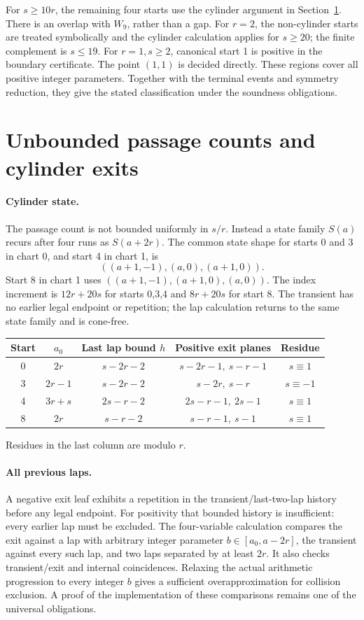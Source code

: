 \documentclass[11pt]{amsart}
\newcommand{\claimid}[1]{}
\theoremstyle{definition}\newtheorem{definition}[theorem]{Definition}
\begin{document}
For $s\ge10r$, the remaining four starts use the cylinder argument in
Section~\ref{sec:cylinders}. There is an overlap with $W_9$, rather than
a gap. For $r=2$, the non-cylinder starts are treated symbolically and
the cylinder calculation applies for $s\ge20$; the finite complement is
$s\le19$. For $r=1,s\ge2$, canonical start 1 is positive in the boundary
certificate. The point $(1,1)$ is decided directly. These regions cover
all positive integer parameters. Together with the terminal events and
symmetry reduction, they give the stated classification under the
soundness obligations.

\section{Unbounded passage counts and cylinder exits}\label{sec:cylinders}
\paragraph{Cylinder state.}\label{lem:cylinders}
The passage count is not bounded uniformly in $s/r$. Instead a state
family $S(a)$ recurs after four runs as $S(a+2r)$. The common state shape
for starts 0 and 3 in chart 0, and start 4 in chart 1, is
\[
 ((a+1,-1),(a,0),(a+1,0)).
\]
Start 8 in chart 1 uses $((a+1,-1),(a+1,0),(a,0))$.
The index increment is $12r+20s$ for starts 0,3,4 and $8r+20s$ for
start 8. The transient has no earlier legal endpoint or repetition;
the lap calculation returns to the same state family and is cone-free.
\claimid{lem:cylinders}

\begin{center}\small
\begin{tabular}{c c c c c}
\toprule
Start&$a_0$&Last lap bound $h$&Positive exit planes&Residue\\\midrule
0&$2r$&$s-2r-2$&$s-2r-1,\ s-r-1$&$s\equiv1$\\
3&$2r-1$&$s-2r-2$&$s-2r,\ s-r$&$s\equiv-1$\\
4&$3r+s$&$2s-r-2$&$2s-r-1,\ 2s-1$&$s\equiv1$\\
8&$2r$&$s-r-2$&$s-r-1,\ s-1$&$s\equiv1$\\\bottomrule
\end{tabular}
\end{center}
Residues in the last column are modulo $r$.

\paragraph{All previous laps.}\label{lem:history}
A negative exit leaf exhibits a repetition in the transient/last-two-lap
history before any legal endpoint. For positivity that bounded history
is insufficient: every earlier lap must be excluded. The four-variable
calculation compares the exit against a lap with arbitrary integer
parameter $b\in[a_0,a-2r]$, the transient against every such lap,
and two laps separated by at least $2r$. It also checks transient/exit
and internal coincidences. Relaxing the actual arithmetic progression
to every integer $b$ gives a sufficient overapproximation for collision
exclusion. A proof of the implementation of these comparisons remains
one of the universal obligations.
\claimid{lem:history}
\end{document}
